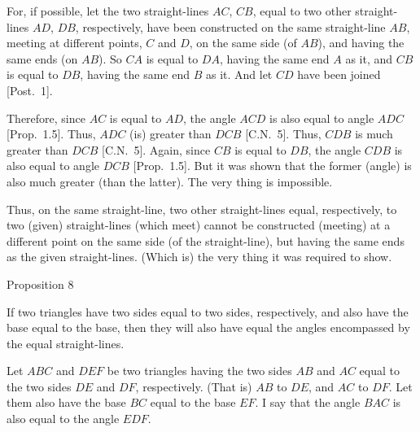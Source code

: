 \epsfysize=1.5in
\centerline{}

For, if possible, let the two straight-lines $AC$, $CB$, equal to two other straight-lines $AD$, $DB$, respectively, have been constructed
on the same straight-line $AB$, meeting at different points, $C$ and $D$, on the
same side (of $AB$), and having the same ends (on $AB$). So $CA$ is equal to $DA$, having the same end $A$ as it, and $CB$ is equal to $DB$, having the
same end $B$ as it. And let $CD$ have been joined [Post.~1].

Therefore, since $AC$ is equal to $AD$,  the angle $ACD$ is also equal to angle $ADC$ [Prop.~1.5].
Thus, $ADC$ (is) greater than $DCB$ [C.N.~5]. Thus, $CDB$ is much greater
than $DCB$ [C.N.~5]. Again, since  $CB$ is equal to $DB$, the angle $CDB$ is also equal to
angle $DCB$ [Prop.~1.5]. But it was shown that the former (angle) is also much
greater (than the latter). The very thing is impossible.

Thus, on the same straight-line, two other straight-lines equal, respectively, to  
two (given) straight-lines  (which meet) cannot be constructed (meeting)
at a different point on the same
side (of the straight-line), but having the same ends as the given straight-lines.
(Which is) the very thing it was required to show.


\begin{center}
{\large Proposition 8}
\end{center}

If two triangles have  two sides equal to two sides, respectively, 
and also have the base equal to the base, then they will
also have equal the angles  encompassed by
the equal straight-lines.

\epsfysize=1.75in
\centerline{}

Let $ABC$ and $DEF$ be two triangles having the two sides $AB$ and $AC$ equal to the two
sides $DE$ and $DF$, respectively. (That is) $AB$ to $DE$, and $AC$ to $DF$.  Let them also have
the base $BC$ equal to the base $EF$. I say that the angle $BAC$ is also equal
to the angle $EDF$.

